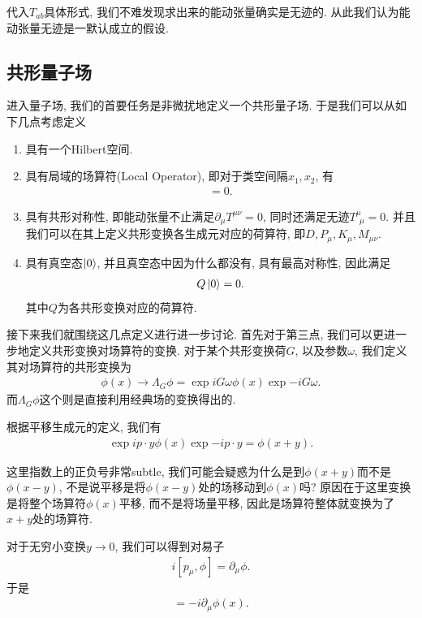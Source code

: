 代入$T_{ab}$具体形式, 我们不难发现求出来的能动张量确实是无迹的. 从此我们认为能动张量无迹是一默认成立的假设.

\subsection{共形量子场}
进入量子场, 我们的首要任务是非微扰地定义一个共形量子场. 于是我们可以从如下几点考虑定义
\begin{enumerate}
    \item 具有一个Hilbert空间.
    \item 具有局域的场算符(Local Operator), 即对于类空间隔$x_1, x_2$, 有\begin{align}
        [\phi(x_1), \phi(x_2)]=0.
    \end{align}
    \item 具有共形对称性, 即能动张量不止满足$\partial_\mu T^{\mu\nu}=0$, 同时还满足无迹$T^\mu_{~~\mu}=0$. 并且我们可以在其上定义共形变换各生成元对应的荷算符, 即$D, P_\mu, K_\mu, M_{\mu\nu}$.
    \item 具有真空态$\ket0$, 并且真空态中因为什么都没有, 具有最高对称性, 因此满足\begin{align}
        Q\ket0=0.
    \end{align}其中$Q$为各共形变换对应的荷算符.
\end{enumerate}

接下来我们就围绕这几点定义进行进一步讨论. 首先对于第三点, 我们可以更进一步地定义共形变换对场算符的变换. 对于某个共形变换荷$G$, 以及参数$\omega$, 我们定义其对场算符的共形变换为
\begin{align}
    \phi(x)\to \Lambda_G\phi=\exp{iG\omega}\phi(x)\exp{-iG\omega}.
\end{align}
而$\Lambda_G\phi$这个则是直接利用经典场的变换得出的.


根据平移生成元的定义, 我们有
\begin{align}
    \exp{ip\cdot y}\phi(x)\exp{-ip\cdot y}=\phi(x+y).
\end{align}
\begin{warning}
    这里指数上的正负号非常subtle, 我们可能会疑惑为什么是到$\phi(x+y)$而不是$\phi(x-y)$, 不是说平移是将$\phi(x-y)$处的场移动到$\phi(x)$吗? 原因在于这里变换是将整个场算符$\phi(x)$平移, 而不是将场量平移, 因此是场算符整体就变换为了$x+y$处的场算符.
\end{warning}
对于无穷小变换$y\to0$, 我们可以得到对易子
\begin{align}
    i[p_\mu, \phi]=\partial_\mu\phi.
\end{align} 
于是
\begin{align}
    [p_\mu, \phi(x)]=-i\partial_\mu\phi(x).
\end{align}

